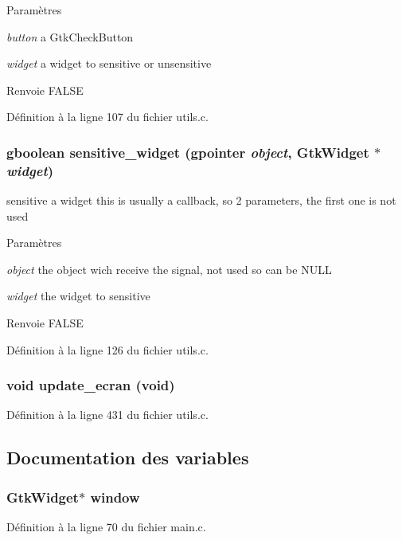 \begin{DoxyParams}{Paramètres}
\item[{\em button}]a GtkCheckButton \item[{\em widget}]a widget to sensitive or unsensitive\end{DoxyParams}
\begin{DoxyReturn}{Renvoie}
FALSE 
\end{DoxyReturn}


Définition à la ligne 107 du fichier utils.c.

\subsubsection[{sensitive\_\-widget}]{\setlength{\rightskip}{0pt plus 5cm}gboolean sensitive\_\-widget (gpointer {\em object}, \/  GtkWidget $\ast$ {\em widget})}\label{utils_8c_a1902d3a5ef1f0899109cd68bf014c7b6}
sensitive a widget this is usually a callback, so 2 parameters, the first one is not used


\begin{DoxyParams}{Paramètres}
\item[{\em object}]the object wich receive the signal, not used so can be NULL \item[{\em widget}]the widget to sensitive\end{DoxyParams}
\begin{DoxyReturn}{Renvoie}
FALSE 
\end{DoxyReturn}


Définition à la ligne 126 du fichier utils.c.

\subsubsection[{update\_\-ecran}]{\setlength{\rightskip}{0pt plus 5cm}void update\_\-ecran (void)}\label{utils_8c_a07c1464833b8611d864feba6eee2d8e1}


Définition à la ligne 431 du fichier utils.c.



\subsection{Documentation des variables}
\subsubsection[{window}]{\setlength{\rightskip}{0pt plus 5cm}GtkWidget$\ast$ {\bf window}}\label{utils_8c_a3d346c08cf2d67c388caabffb412b293}


Définition à la ligne 70 du fichier main.c.

